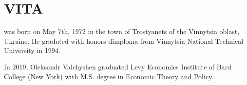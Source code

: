 %
%
\section*{\MakeUppercase{Vita}}

\MyName \hspace{0.05in} was born on May 7th, 1972 in the town of Trostyanets of the Vinnytsia oblast, Ukraine. He graduted with honors dimploma from Vinnytsia National Technical University in 1994.

In 2019, Oleksandr Valchyshen graduated Levy Economics Institute of Bard College (New York) with M.S. degree in Economic Theory and Policy. 


